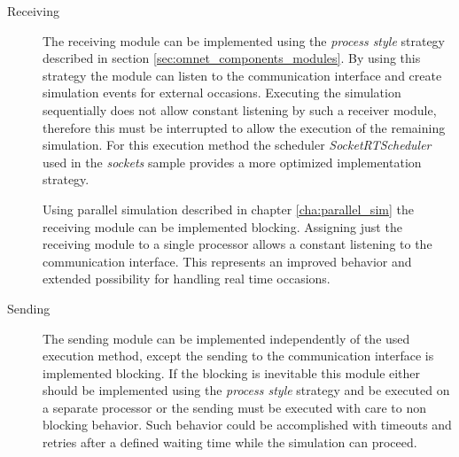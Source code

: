 \begin{description}
    \item[Receiving] The receiving module can be implemented using the \emph{process style} strategy described in section \ref{sec:omnet_components_modules}.
    By using this strategy the module can listen to the communication interface and create simulation events for external occasions.
    Executing the simulation sequentially does not allow constant listening by such a receiver module, therefore this must be interrupted to allow the execution of the remaining simulation.
    For this execution method the scheduler \emph{SocketRTScheduler} used in the \emph{sockets} sample provides a more optimized implementation strategy.
    
    Using parallel simulation described in chapter \ref{cha:parallel_sim} the receiving module can be implemented blocking.
    Assigning just the receiving module to a single processor allows a constant listening to the communication interface.
    This represents an improved behavior and extended possibility for handling real time occasions.
    
    \item[Sending] The sending module can be implemented independently of the used execution method, except the sending to the communication interface is implemented blocking.
    If the blocking is inevitable this module either should be implemented using the \emph{process style} strategy and be executed on a separate processor or the sending must be executed with care to non blocking behavior.
    Such behavior could be accomplished with timeouts and retries after a defined waiting time while the simulation can proceed.
\end{description}